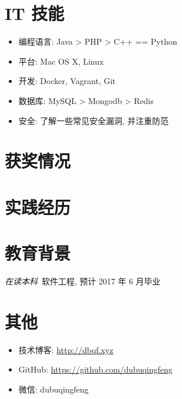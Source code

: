 \documentclass{resume}
\begin{document}
\section{IT 技能}
\begin{onehalfspacing}
\begin{itemize}[parsep=0.5ex]
  \item 编程语言: Java > PHP > C++ == Python
  \item 平台: Mac OS X, Linux
  \item 开发: Docker, Vagrant, Git
  \item 数据库: MySQL > Mongodb > Redis
  \item 安全: 了解一些常见安全漏洞, 并注重防范
\end{itemize}
\end{onehalfspacing}

\section{获奖情况}

\section{实践经历}

\section{教育背景}
\textit{在读本科}\ 软件工程, 预计 2017 年 6 月毕业

\section{其他}
\begin{itemize}[parsep=0.5ex]
  \item 技术博客: \href{http://dbqf.xyz}{http://dbqf.xyz}
  \item GitHub: \href{https://github.com/dubuqingfeng}{https://github.com/dubuqingfeng}
  \item 微信: dubuqingfeng
\end{itemize}
\end{document}

